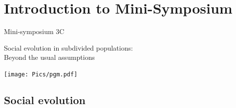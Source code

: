 \documentclass[]{beamer}
\begin{document}
\section{Introduction to Mini-Symposium}
\begin{frame}
\begin{center}
Mini-symposium 3C
\vspace{1em}

{\Large
Social evolution in subdivided populations:\\\vspace{0.5em}
Beyond the usual assumptions
}

\vspace{1em}
\texttt{[image: Pics/pgm.pdf]}
\end{center}
\end{frame}

\subsection{Social evolution}
\end{document}
